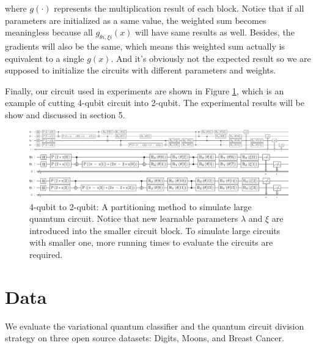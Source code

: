 \documentclass[sigconf]{acmart}
\begin{document}
where $g(\cdot)$ represents the multiplication result of each block. Notice that if all parameters are initialized as a same value, the weighted sum becomes meaningless because all $g_{\theta i, \xi i}(x)$ will have same results as well. Besides, the gradients will also be the same, which means this weighted sum actually is equivalent to a single $g(x)$. And it's obviously not the expected result so we are supposed to initialize the circuits with different parameters and weights.

Finally, our circuit used in experiments are shown in Figure \ref{fig:cutting}, which is an example of cutting 4-qubit circuit into 2-qubit. The experimental results will be show and discussed in section 5.
\begin{figure}[!ht]
	\begin{minipage}[t]{0.9\textwidth}%
		\centering
		\includegraphics[width=\textwidth]{lar.png}
	\end{minipage}
	\begin{minipage}[t]{0.9\textwidth}%
		\centering
		\includegraphics[width=\textwidth]{par1.png}
	\end{minipage}
	\begin{minipage}[t]{0.9\textwidth}%
	    \centering
		\includegraphics[width=\textwidth]{par2.png}
	\end{minipage}
	\caption{4-qubit to 2-qubit: {\small \textnormal{A partitioning method to simulate large quamtum circuit. Notice that new learnable parameters $\lambda$ and $\xi$ are introduced into the smaller circuit block. To simulate large circuits with smaller one, more running times to evaluate the circuits are required.}} }
	\label{fig:cutting}
\end{figure}

\section{Data}
We evaluate the variational quantum classifier and the quantum circuit division strategy on three open source datasets: Digits, Moons, and Breast Cancer. 
\end{document}
